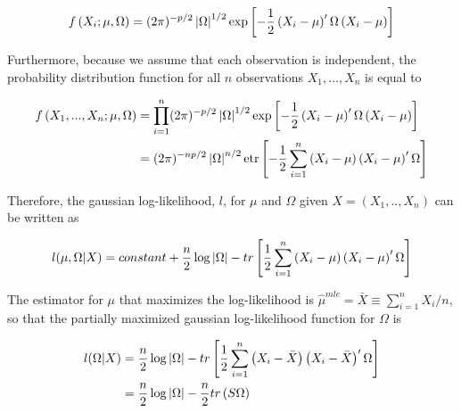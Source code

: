 \documentclass[11pt,]{report}
\theoremstyle{definition}
\theoremstyle{definition}
\theoremstyle{definition}
\theoremstyle{remark}
\begin{document}
\begin{equation} 
  f\left(X_{i}; \mu, \Omega\right) = (2\pi)^{-p/2}\left| \Omega \right|^{1/2}\exp\left[ -\frac{1}{2}\left( X_{i} - \mu \right)'\Omega\left( X_{i} - \mu \right) \right] 
\label{eq:normallikone}\notag
\end{equation}

Furthermore, because we assume that each observation is independent, the probability distribution function for all \(n\) observations \(X_{1}, ..., X_{n}\) is equal to

\begin{equation} 
\begin{split}
  f\left(X_{1}, ..., X_{n}; \mu, \Omega\right) &= \prod_{i = 1}^{n}(2\pi)^{-p/2}\left| \Omega \right|^{1/2}\exp\left[ -\frac{1}{2}\left( X_{i} - \mu \right)'\Omega\left( X_{i} - \mu \right) \right] \\
  &= (2\pi)^{-np/2}\left| \Omega \right|^{n/2}\mbox{etr}\left[ -\frac{1}{2}\sum_{i = 1}^{n}\left( X_{i} - \mu \right)\left( X_{i} - \mu \right)'\Omega \right]
\end{split}
\label{eq:normallik}\notag
\end{equation}

Therefore, the gaussian log-likelihood, \(l\), for \(\mu\) and \(\Omega\) given \(X = (X_{1}, .., X_{n})\) can be written as

\begin{equation}
  l(\mu, \Omega | X) = constant + \frac{n}{2}\log\left| \Omega \right| - tr\left[ \frac{1}{2}\sum_{i = 1}^{n}\left(X_{i} - \mu \right)\left(X_{i} - \mu \right)'\Omega \right]
\label{eq:normalloglik}\notag
\end{equation}

The estimator for \(\mu\) that maximizes the log-likelihood is \(\hat{\mu}^{mle} = \bar{X} \equiv \sum_{i = 1}^{n}X_{i}/n\), so that the partially maximized gaussian log-likelihood function for \(\Omega\) is

\begin{equation}
\begin{split}
  l(\Omega | X) &= \frac{n}{2}\log\left| \Omega \right| - tr\left[ \frac{1}{2}\sum_{i = 1}^{n}\left(X_{i} - \bar{X} \right)\left(X_{i} - \bar{X} \right)'\Omega \right] \\
  &= \frac{n}{2}\log\left| \Omega \right| - \frac{n}{2}tr\left( S\Omega \right)
\label{eq:partialmaxloglik}\notag
\end{split}
\end{equation}
\end{document}
